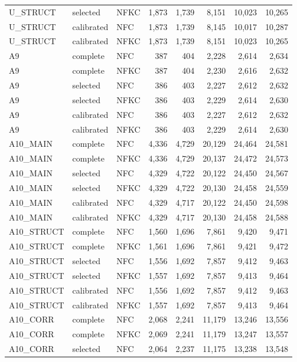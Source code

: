 \documentclass[10pt]{article}
\begin{document}
\begin{center}
\begin{tabular}{lllrrrrr}
U\_STRUCT & selected & NFKC & 1,873 & 1,739 & 8,151 & 10,023 & 10,265\\
U\_STRUCT & calibrated & NFC & 1,873 & 1,739 & 8,145 & 10,017 & 10,287\\
U\_STRUCT & calibrated & NFKC & 1,873 & 1,739 & 8,151 & 10,023 & 10,265\\
A9 & complete & NFC & 387 & 404 & 2,228 & 2,614 & 2,634\\
A9 & complete & NFKC & 387 & 404 & 2,230 & 2,616 & 2,632\\
A9 & selected & NFC & 386 & 403 & 2,227 & 2,612 & 2,632\\
A9 & selected & NFKC & 386 & 403 & 2,229 & 2,614 & 2,630\\
A9 & calibrated & NFC & 386 & 403 & 2,227 & 2,612 & 2,632\\
A9 & calibrated & NFKC & 386 & 403 & 2,229 & 2,614 & 2,630\\
A10\_MAIN & complete & NFC & 4,336 & 4,729 & 20,129 & 24,464 & 24,581\\
A10\_MAIN & complete & NFKC & 4,336 & 4,729 & 20,137 & 24,472 & 24,573\\
A10\_MAIN & selected & NFC & 4,329 & 4,722 & 20,122 & 24,450 & 24,567\\
A10\_MAIN & selected & NFKC & 4,329 & 4,722 & 20,130 & 24,458 & 24,559\\
A10\_MAIN & calibrated & NFC & 4,329 & 4,717 & 20,122 & 24,450 & 24,598\\
A10\_MAIN & calibrated & NFKC & 4,329 & 4,717 & 20,130 & 24,458 & 24,588\\
A10\_STRUCT & complete & NFC & 1,560 & 1,696 & 7,861 & 9,420 & 9,471\\
A10\_STRUCT & complete & NFKC & 1,561 & 1,696 & 7,861 & 9,421 & 9,472\\
A10\_STRUCT & selected & NFC & 1,556 & 1,692 & 7,857 & 9,412 & 9,463\\
A10\_STRUCT & selected & NFKC & 1,557 & 1,692 & 7,857 & 9,413 & 9,464\\
A10\_STRUCT & calibrated & NFC & 1,556 & 1,692 & 7,857 & 9,412 & 9,463\\
A10\_STRUCT & calibrated & NFKC & 1,557 & 1,692 & 7,857 & 9,413 & 9,464\\
A10\_CORR & complete & NFC & 2,068 & 2,241 & 11,179 & 13,246 & 13,556\\
A10\_CORR & complete & NFKC & 2,069 & 2,241 & 11,179 & 13,247 & 13,557\\
A10\_CORR & selected & NFC & 2,064 & 2,237 & 11,175 & 13,238 & 13,548\\

\end{tabular}
\end{center}
\end{document}
